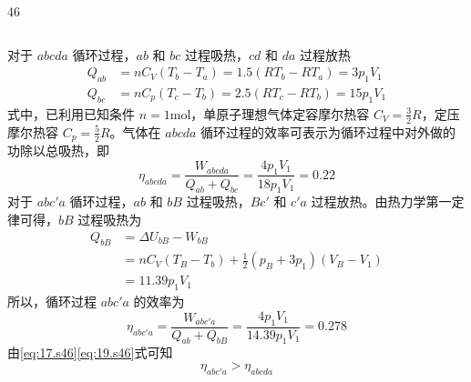 \begin{solution}{46}
\begin{subsolution}
\begin{equation}
            \label{eq:15.s46}
        \end{equation}
    \end{subsolution}
    \begin{subsolution}
        对于 $abcda$ 循环过程，$ab$ 和 $bc$ 过程吸热，$cd$ 和 $da$ 过程放热
        \begin{equation}
            \begin{aligned}
                Q_{ab} &= n C_{V}(T_{b} - T_{a}) = 1.5(RT_{b} - RT_{a}) = 3p_{1}V_{1} \\
                Q_{bc} &= n C_{p}(T_{c} - T_{b}) = 2.5(RT_{c} - RT_{b}) = 15p_{1}V_{1}
            \end{aligned}
            \label{eq:16.s46}
        \end{equation}
        式中，已利用已知条件 $n = 1\mathrm{mol}$，单原子理想气体定容摩尔热容 $C_{V} = \frac{3}{2}R$，定压摩尔热容 $C_{p} = \frac{5}{2}R$。气体在 $abcda$ 循环过程的效率可表示为循环过程中对外做的功除以总吸热，即
        \begin{equation}
            \eta_{abcda} = \frac{W_{abcda}}{Q_{ab} + Q_{bc}} = \frac{4p_{1}V_{1}}{18p_{1}V_{1}} = 0.22
            \label{eq:17.s46}
        \end{equation}
        对于 $abc'a$ 循环过程，$ab$ 和 $bB$ 过程吸热，$Bc'$ 和 $c'a$ 过程放热。由热力学第一定律可得，$bB$ 过程吸热为
        \begin{equation}
            \begin{aligned}
                Q_{bB} &= \Delta U_{bB} - W_{bB} \\
                &= n C_{V}(T_{B} - T_{b}) + \frac{1}{2}(p_{B} + 3p_{1})(V_{B} - V_{1}) \\
                &= 11.39p_{1}V_{1}
            \end{aligned}
            \label{eq:18.s46}
        \end{equation}
        所以，循环过程 $abc'a$ 的效率为
        \begin{equation}
            \eta_{abc'a} = \frac{W_{abc'a}}{Q_{ab} + Q_{bB}} = \frac{4p_{1}V_{1}}{14.39p_{1}V_{1}} = 0.278
            \label{eq:19.s46}
        \end{equation}
        由\eqref{eq:17.s46}\eqref{eq:19.s46}式可知
        \begin{equation}
            \eta_{abc'a} > \eta_{abcda}
            \label{eq:20.s46}
        \end{equation}
    \end{subsolution}
\end{solution}